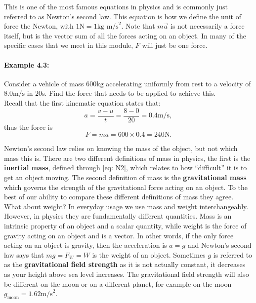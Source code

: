This is one of the most famous equations in physics and is commonly just referred to as Newton's second law. This equation is how we define the unit of force the Newton, with $1 \text{N}=1\text{kg m/s}^{2}$.  Note that $m\vec{a}$ is not necessarily a force itself, but is the vector sum of all the forces acting on an object. In many of the specific cases that we meet in this module, $F$ will just be one force.

\paragraph{Example 4.3:} Consider a vehicle of mass $600\text{kg}$ accelerating uniformly from rest to a velocity of $8.0\text{m/s}$ in $20$s. Find the force that needs to be applied to achieve this.\\

Recall that the first kinematic equation states that:
\begin{equation*}
a=\frac{v-u}{t}=\frac{8-0}{20}=0.4\text{m/s},
\end{equation*}
thus the force is
\begin{equation*}
F=ma=600\times 0.4=240\text{N}.
\end{equation*}

Newton's second law relies on knowing the mass of the object, but not which mass this is. There are two different definitions of mass in physics, the first is the \textbf{inertial mass}, defined through \cref{eq: N2}, which relates to how ``difficult'' it is to get an object moving. The second definition of mass is the \textbf{gravitational mass} which governs the strength of the gravitational force acting on an object. To the best of our ability to compare these different definitions of mass they agree.\\

What about weight? In everyday usage we use mass and weight interchangeably. However, in physics they are fundamentally different quantities. Mass is an intrinsic property of an object and a scalar quantity, while weight is the force of gravity acting on an object and is a vector. In other words, if the only force acting on an object is gravity, then the acceleration is $a=g$ and Newton's second law says that $mg=F_{W}=W$ is the weight of an object. Sometimes $g$ is referred to as the \textbf{gravitational field strength} as it is not actually constant, it decreases as your height above sea level increases.  The gravitational field strength will also be different on the moon or on a different planet, for example on the moon $g_{\text{moon}}=1.62\text{m/s}^{2}$.

